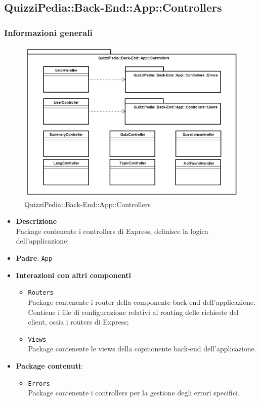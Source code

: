 \subsection{QuizziPedia::Back-End::App::Controllers}
\subsubsection{Informazioni generali}
\label{QuizziPedia::Back-End::App::Controllers}
\begin{figure}[ht]
	\centering
	\includegraphics[scale=0.45]{UML/Package/QuizziPedia_Back-End_App_Controllers.png}
	\caption{QuizziPedia::Back-End::App::Controllers}
\end{figure}
\FloatBarrier
	\begin{itemize}
		\item \textbf{Descrizione} \\
		Package contenente i controllers di Express, definisce la logica dell'applicazione;
		\item \textbf{Padre}: \texttt{App}
		\item \textbf{Interazioni con altri componenti}
			\begin{itemize}
				\item \texttt{Routers} \\
				Package contenente i router della componente back-end dell'applicazione. Contiene i file di configurazione relativi al routing delle richieste del client, ossia i routers di Express;
				\item \texttt{Views} \\
				Package contenente le views della copmonente back-end dell'applicazione.
			\end{itemize}
		\item \textbf{Package contenuti}:
			\begin{itemize}
				\item \texttt{Errors} \\
				Package contenente i controllers per la gestione degli errori specifici.
			\end{itemize}
	\end{itemize}
